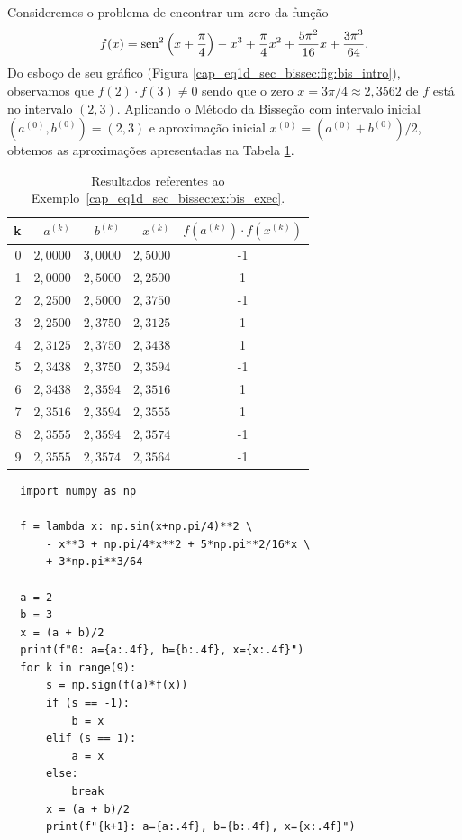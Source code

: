 \begin{ex}\label{cap_eq1d_sec_bissec:ex:bis_exec}
  Consideremos o problema de encontrar um zero da função
\begin{equation}
  f(x) = \operatorname{sen}^2\left(x+\frac{\pi}{4}\right) - x^3 + \frac{\pi}{4}x^2 + \frac{5\pi^2}{16}x + \frac{3\pi^3}{64}.
\end{equation}
Do esboço de seu gráfico (Figura \ref{cap_eq1d_sec_bissec:fig:bis_intro}), observamos que $f(2)\cdot f(3) \neq 0$ sendo que o zero $x=3\pi/4\approx 2,3562$ de $f$ está no intervalo $(2, 3)$. Aplicando o Método da Bisseção com intervalo inicial $(a^{(0)}, b^{(0)}) = (2, 3)$ e aproximação inicial $x^{(0)} = (a^{(0)}+b^{(0)})/2$, obtemos as aproximações apresentadas na Tabela \ref{cap_eq1d_sec_bissec:tab:bis_exec}.

\begin{table}[h!]
  \centering
  \caption{Resultados referentes ao Exemplo~\ref{cap_eq1d_sec_bissec:ex:bis_exec}.}
  \begin{tabular}{r|rr|r|c}
    k & $a^{(k)}$ & $b^{(k)}$ & $x^{(k)}$ & $f(a^{(k)})\cdot f(x^{(k)})$\\\hline
    0 & $2,0000$ & $3,0000$ & $2,5000$ & -1 \\
    1 & $2,0000$ & $2,5000$ & $2,2500$ &  1 \\
    2 & $2,2500$ & $2,5000$ & $2,3750$ & -1 \\
    3 & $2,2500$ & $2,3750$ & $2,3125$ & 1 \\
    4 & $2,3125$ & $2,3750$ & $2,3438$ & 1 \\
    5 & $2,3438$ & $2,3750$ & $2,3594$ &  -1 \\
    6 & $2,3438$ & $2,3594$ & $2,3516$ & 1 \\
    7 & $2,3516$ & $2,3594$ & $2,3555$ &  1 \\
    8 & $2,3555$ & $2,3594$ & $2,3574$ &  -1 \\
    9 & $2,3555$ & $2,3574$ & $2,3564$ & -1 \\\hline
  \end{tabular}
  \label{cap_eq1d_sec_bissec:tab:bis_exec}
\end{table}

\begin{lstlisting}
  import numpy as np

  f = lambda x: np.sin(x+np.pi/4)**2 \
      - x**3 + np.pi/4*x**2 + 5*np.pi**2/16*x \
      + 3*np.pi**3/64

  a = 2
  b = 3
  x = (a + b)/2
  print(f"0: a={a:.4f}, b={b:.4f}, x={x:.4f}")
  for k in range(9):
      s = np.sign(f(a)*f(x))
      if (s == -1):
          b = x
      elif (s == 1):
          a = x
      else:
          break
      x = (a + b)/2
      print(f"{k+1}: a={a:.4f}, b={b:.4f}, x={x:.4f}")
\end{lstlisting}
\end{ex}

